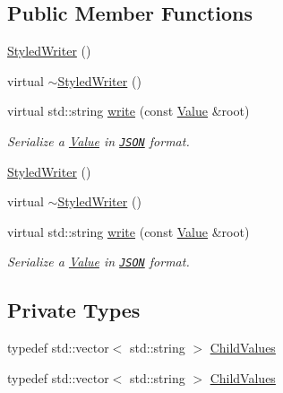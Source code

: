 \subsection*{Public Member Functions}
\begin{DoxyCompactItemize}
\item 
\hyperlink{classJson_1_1StyledWriter_a1f1b5f922a6a0ef0e56c6dd2f6170192}{Styled\-Writer} ()
\item 
virtual \hyperlink{classJson_1_1StyledWriter_a7eb58eabb70c6b80ac1ccec93c0c8602}{$\sim$\-Styled\-Writer} ()
\item 
virtual std\-::string \hyperlink{classJson_1_1StyledWriter_a35036ba0842bc65500274c9ec30708d1}{write} (const \hyperlink{classJson_1_1Value}{Value} \&root)
\begin{DoxyCompactList}\small\item\em Serialize a \hyperlink{classJson_1_1Value}{Value} in \href{http://www.json.org}{\tt J\-S\-O\-N} format. \end{DoxyCompactList}\item 
\hyperlink{classJson_1_1StyledWriter_a1f1b5f922a6a0ef0e56c6dd2f6170192}{Styled\-Writer} ()
\item 
virtual \hyperlink{classJson_1_1StyledWriter_a7eb58eabb70c6b80ac1ccec93c0c8602}{$\sim$\-Styled\-Writer} ()
\item 
virtual std\-::string \hyperlink{classJson_1_1StyledWriter_a35036ba0842bc65500274c9ec30708d1}{write} (const \hyperlink{classJson_1_1Value}{Value} \&root)
\begin{DoxyCompactList}\small\item\em Serialize a \hyperlink{classJson_1_1Value}{Value} in \href{http://www.json.org}{\tt J\-S\-O\-N} format. \end{DoxyCompactList}\end{DoxyCompactItemize}
\subsection*{Private Types}
\begin{DoxyCompactItemize}
\item 
typedef std\-::vector$<$ std\-::string $>$ \hyperlink{classJson_1_1StyledWriter_a0b102abcd4b7e11eb22df63921e097df}{Child\-Values}
\item 
typedef std\-::vector$<$ std\-::string $>$ \hyperlink{classJson_1_1StyledWriter_a0b102abcd4b7e11eb22df63921e097df}{Child\-Values}
\end{DoxyCompactItemize}
